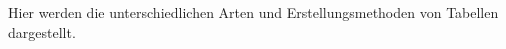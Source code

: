 \documentclass[a4paper, 12pt]{article}
\begin{document}
Hier werden die unterschiedlichen Arten und Erstellungsmethoden von Tabellen dargestellt.
\end{document}
